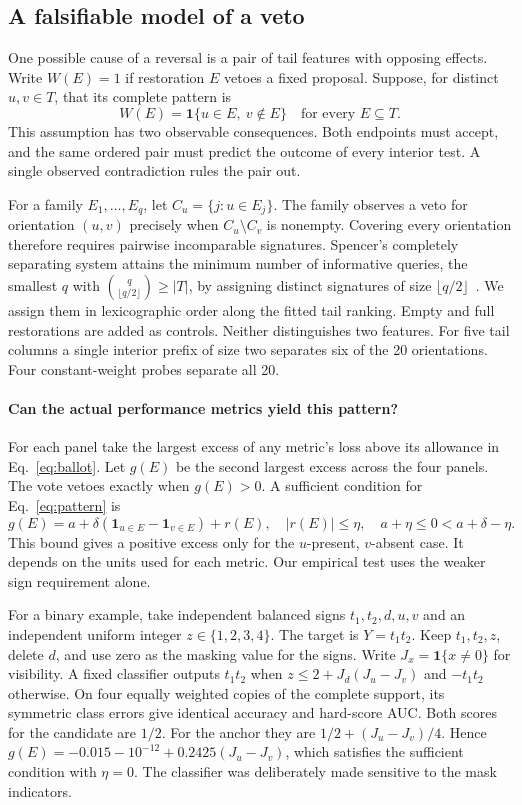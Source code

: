 \subsection{A falsifiable model of a veto}
\label{sec:context-design}
One possible cause of a reversal is a pair of tail features with opposing effects. Write $W(E)=1$ if restoration $E$ vetoes a fixed proposal. Suppose, for distinct $u,v\in T$, that its complete pattern is
\begin{equation}
 W(E)=\mathbf 1\{u\in E,\ v\notin E\}\quad\text{for every }E\subseteq T .
 \label{eq:pattern}
\end{equation}
This assumption has two observable consequences. Both endpoints must accept, and the same ordered pair must predict the outcome of every interior test. A single observed contradiction rules the pair out.

For a family $E_1,\dots,E_q$, let $C_u=\{j:u\in E_j\}$. The family observes a veto for orientation $(u,v)$ precisely when $C_u\setminus C_v$ is nonempty. Covering every orientation therefore requires pairwise incomparable signatures. Spencer's completely separating system attains the minimum number of informative queries, the smallest $q$ with $\binom{q}{\lfloor q/2\rfloor}\ge |T|$, by assigning distinct signatures of size $\lfloor q/2\rfloor$~\cite{spencer1970separating,hyttinen2013experiments}. We assign them in lexicographic order along the fitted tail ranking. Empty and full restorations are added as controls. Neither distinguishes two features. For five tail columns a single interior prefix of size two separates six of the 20 orientations. Four constant-weight probes separate all 20.

\paragraph{Can the actual performance metrics yield this pattern?}
For each panel take the largest excess of any metric's loss above its allowance in Eq.~\eqref{eq:ballot}. Let $g(E)$ be the second largest excess across the four panels. The vote vetoes exactly when $g(E)>0$. A sufficient condition for Eq.~\eqref{eq:pattern} is
\[
 g(E)=a+\delta(\mathbf 1_{u\in E}-\mathbf 1_{v\in E})+r(E),\quad
 |r(E)|\leq\eta,\quad a+\eta\leq0<a+\delta-\eta .
\]
This bound gives a positive excess only for the $u$-present, $v$-absent case. It depends on the units used for each metric. Our empirical test uses the weaker sign requirement alone.

For a binary example, take independent balanced signs $t_1,t_2,d,u,v$ and an independent uniform integer $z\in\{1,2,3,4\}$. The target is $Y=t_1t_2$. Keep $t_1,t_2,z$, delete $d$, and use zero as the masking value for the signs. Write $J_x=\mathbf 1\{x\ne0\}$ for visibility. A fixed classifier outputs $t_1t_2$ when $z\leq 2+J_d(J_u-J_v)$ and $-t_1t_2$ otherwise. On four equally weighted copies of the complete support, its symmetric class errors give identical accuracy and hard-score AUC. Both scores for the candidate are $1/2$. For the anchor they are $1/2+(J_u-J_v)/4$. Hence $g(E)=-0.015-10^{-12}+0.2425(J_u-J_v)$, which satisfies the sufficient condition with $\eta=0$. The classifier was deliberately made sensitive to the mask indicators.

